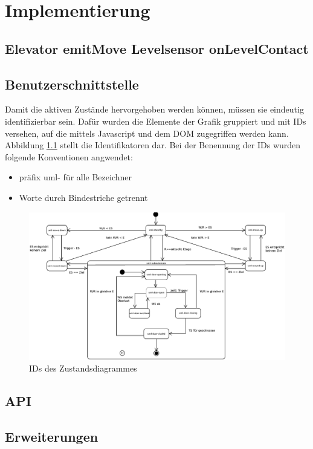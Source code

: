 \chapter{Implementierung}
\section{Elevator emitMove Levelsensor onLevelContact}

\section{Benutzerschnittstelle}
Damit die aktiven Zustände hervorgehoben werden können, müssen sie eindeutig identifizierbar sein. Dafür wurden die Elemente der Grafik gruppiert und mit IDs versehen, auf die mittels Javascript und dem \acrshort{DOM} zugegriffen werden kann. Abbildung \ref{fig:ZD_id_view} stellt die Identifikatoren dar. Bei der Benennung der IDs wurden folgende Konventionen angwendet:
\begin{itemize}
	\item präfix uml- für alle Bezeichner
	\item Worte durch Bindestriche getrennt
\end{itemize}

\begin{figure}[hbt]
	\centering
	\includegraphics[width=\textwidth]{images/ZDv6_id_view.eps}
	\caption{IDs des Zustandsdiagrammes}%
	\label{fig:ZD_id_view}%
\end{figure}

\section{API}

\section{Erweiterungen}

